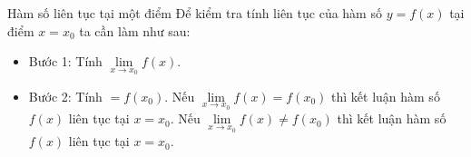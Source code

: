 \begin{dang}{Hàm số liên tục tại một điểm}
	Để kiểm tra tính liên tục của hàm số $y=f(x)$ tại điểm $x=x_0$ ta cần làm như sau:
	\begin{itemize}
		\item Bước 1: Tính $\mathop {\lim }\limits_{x \to {x_0}} f\left( x \right).$
		\item Bước 2: Tính $= f\left( {{x_0}} \right).$
		Nếu $\mathop {\lim }\limits_{x \to {x_0}} f\left( x \right) = f\left( {{x_0}} \right)$ thì kết luận hàm số $f(x)$ liên tục tại $x=x_0.$
		Nếu $\mathop {\lim }\limits_{x \to {x_0}} f\left( x \right) \ne f\left( {{x_0}} \right)$ thì kết luận hàm số $f(x)$ liên tục tại $x=x_0.$
	\end{itemize}
\end{dang}
